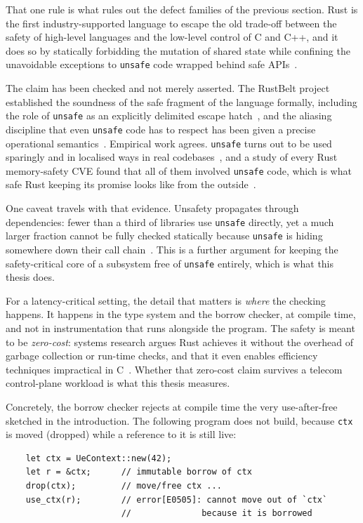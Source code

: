 \documentclass[english,twoside,openright,a4paper,censored,csm,software-track-2020]{HYthesisML}
\begin{document}
That one rule is what rules out the defect families of the previous section. Rust is the first
industry-supported language to escape the old trade-off between the safety of high-level
languages and the low-level control of C and C++, and it does so by statically forbidding the
mutation of shared state while confining the unavoidable exceptions to \texttt{unsafe} code
wrapped behind safe APIs~\cite{jung2021safe}.

The claim has been checked and not merely asserted. The RustBelt project established the
soundness of the safe fragment of the language formally, including the role of \texttt{unsafe}
as an explicitly delimited escape hatch~\cite{jung2018rustbelt}, and the aliasing discipline
that even \texttt{unsafe} code has to respect has been given a precise operational
semantics~\cite{jung2020stacked}. Empirical work agrees. \texttt{unsafe} turns out to be used
sparingly and in localised ways in real codebases~\cite{astrauskas2020unsafe,qin2020rust}, and a
study of every Rust memory-safety CVE found that all of them involved \texttt{unsafe} code,
which is what safe Rust keeping its promise looks like from the
outside~\cite{xu2021rustcve}.

One caveat travels with that evidence. Unsafety propagates through dependencies: fewer than a
third of libraries use \texttt{unsafe} directly, yet a much larger fraction cannot be fully
checked statically because \texttt{unsafe} is hiding somewhere down their call
chain~\cite{evans2020rust}. This is a further argument for keeping the safety-critical core of a
subsystem free of \texttt{unsafe} entirely, which is what this thesis does.

For a latency-critical setting, the detail that matters is \emph{where} the checking happens. It
happens in the type system and the borrow checker, at compile time, and not in instrumentation
that runs alongside the program. The safety is meant to be \emph{zero-cost}: systems research
argues Rust achieves it without the overhead of garbage collection or run-time checks, and that
it even enables efficiency techniques impractical in C~\cite{balasubramanian2017rust}. Whether
that zero-cost claim survives a telecom control-plane workload is what this thesis measures.

Concretely, the borrow checker rejects at compile time the very use-after-free sketched in the
introduction. The following program does not build, because \texttt{ctx} is moved (dropped)
while a reference to it is still live:

\begin{verbatim}
    let ctx = UeContext::new(42);
    let r = &ctx;      // immutable borrow of ctx
    drop(ctx);         // move/free ctx ...
    use_ctx(r);        // error[E0505]: cannot move out of `ctx`
                       //              because it is borrowed
\end{verbatim}
\end{document}
